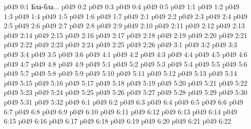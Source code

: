 \author{Мелхиседек}
\vs p049 0:1  Бла-бла...
\vs p049 0:2 \pc 
\vs p049 0:3 \pc 
\vs p049 0:4 
\vs p049 0:5 
\vs p049 1:1 
\vs p049 1:2 
\vs p049 1:3 
\vs p049 1:4 
\vs p049 1:5 
\vs p049 1:6 
\vs p049 1:7 
\vs p049 2:1 
\vs p049 2:2 
\vs p049 2:3 
\vs p049 2:4 
\vs p049 2:5 
\vs p049 2:6 
\vs p049 2:7 
\vs p049 2:8 
\vs p049 2:9 \pc 
\vs p049 2:10 
\vs p049 2:11 
\vs p049 2:12 
\vs p049 2:13 
\vs p049 2:14 
\vs p049 2:15 
\vs p049 2:16 
\vs p049 2:17 
\vs p049 2:18 
\vs p049 2:19 
\vs p049 2:20 
\vs p049 2:21 
\vs p049 2:22 
\vs p049 2:23 
\vs p049 2:24 
\vs p049 2:25 
\vs p049 2:26 
\vs p049 3:1 
\vs p049 3:2 
\vs p049 3:3 
\vs p049 3:4 
\vs p049 3:5 
\vs p049 3:6 
\vs p049 4:1 
\vs p049 4:2 
\vs p049 4:3 
\vs p049 4:4 
\vs p049 4:5 \pc 
\vs p049 4:6 
\vs p049 4:7 
\vs p049 4:8 \pc 
\vs p049 4:9 
\vs p049 5:1 
\vs p049 5:2 
\vs p049 5:3 
\vs p049 5:4 
\vs p049 5:5 
\vs p049 5:6 
\vs p049 5:7 
\vs p049 5:8 
\vs p049 5:9 \pc 
\vs p049 5:10 
\vs p049 5:11 
\vs p049 5:12 
\vs p049 5:13 
\vs p049 5:14 
\vs p049 5:15 
\vs p049 5:16 
\vs p049 5:17 
\vs p049 5:18 
\vs p049 5:19 
\vs p049 5:20 
\vs p049 5:21 
\vs p049 5:22 
\vs p049 5:23 
\vs p049 5:24 
\vs p049 5:25 
\vs p049 5:26 
\vs p049 5:27 
\vs p049 5:28 
\vs p049 5:29 
\vs p049 5:30 
\vs p049 5:31 
\vs p049 5:32 
\vs p049 6:1 
\vs p049 6:2 
\vs p049 6:3 
\vs p049 6:4 
\vs p049 6:5 
\vs p049 6:6 
\vs p049 6:7 
\vs p049 6:8 
\vs p049 6:9 
\vs p049 6:10 
\vs p049 6:11 
\vs p049 6:12 
\vs p049 6:13 
\vs p049 6:14 
\vs p049 6:15 
\vs p049 6:16 
\vs p049 6:17 
\vs p049 6:18 
\vs p049 6:19 
\vs p049 6:20 
\vs p049 6:21 
\vsetoff
\vs p049 6:22 
\quizlink
